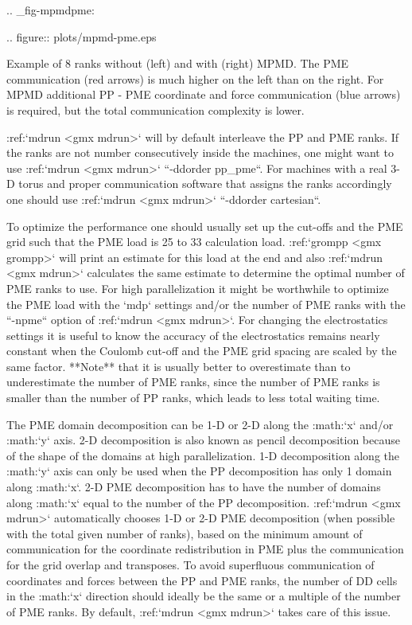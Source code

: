 {.. _fig-mpmdpme:

.. figure:: plots/mpmd-pme.eps

   Example of 8 ranks without (left) and with (right) MPMD. The
   PME communication (red arrows) is much higher on the left than on the
   right. For MPMD additional PP - PME coordinate and force
   communication (blue arrows) is required, but the total communication
   complexity is lower.

:ref:`mdrun <gmx mdrun>` will by default interleave the PP and PME ranks.
If the ranks are not number consecutively inside the machines, one might
want to use :ref:`mdrun <gmx mdrun>` ``-ddorder pp_pme``. For machines with a
real 3-D torus and proper communication software that assigns the ranks
accordingly one should use :ref:`mdrun <gmx mdrun>` ``-ddorder cartesian``.

To optimize the performance one should usually set up the cut-offs and
the PME grid such that the PME load is 25 to 33%
calculation load. :ref:`grompp <gmx grompp>` will print an estimate for this
load at the end and also :ref:`mdrun <gmx mdrun>` calculates the same
estimate to determine the optimal number of PME ranks to use. For high
parallelization it might be worthwhile to optimize the PME load with the
`mdp` settings and/or the number of PME ranks with the
``-npme`` option of :ref:`mdrun <gmx mdrun>`. For changing the
electrostatics settings it is useful to know the accuracy of the
electrostatics remains nearly constant when the Coulomb cut-off and the
PME grid spacing are scaled by the same factor. **Note** that it is
usually better to overestimate than to underestimate the number of PME
ranks, since the number of PME ranks is smaller than the number of PP
ranks, which leads to less total waiting time.

The PME domain decomposition can be 1-D or 2-D along the :math:`x`
and/or :math:`y` axis. 2-D decomposition is also known as pencil
decomposition 
because of the
shape of the domains at high parallelization. 1-D decomposition along
the :math:`y` axis can only be used when the PP decomposition has only 1
domain along :math:`x`. 2-D PME decomposition has to have the number of
domains along :math:`x` equal to the number of the PP decomposition.
:ref:`mdrun <gmx mdrun>` automatically chooses 1-D or 2-D PME decomposition
(when possible with the total given number of ranks), based on the
minimum amount of communication for the coordinate redistribution in PME
plus the communication for the grid overlap and transposes. To avoid
superfluous communication of coordinates and forces between the PP and
PME ranks, the number of DD cells in the :math:`x` direction should
ideally be the same or a multiple of the number of PME ranks. By
default, :ref:`mdrun <gmx mdrun>` takes care of this issue.

}
